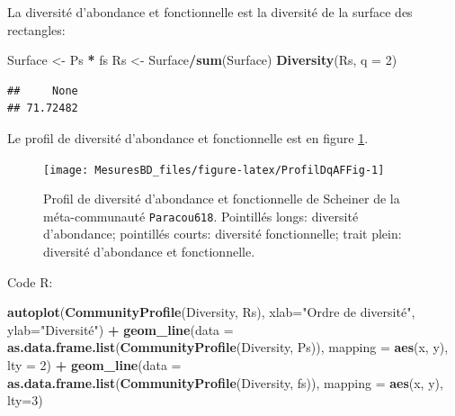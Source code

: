 \documentclass[
  11pt,
  french,
  a4paper,
  extrafontsizes,onecolumn,openright
  ]{memoir}
\newenvironment{Shaded}{\begin{snugshade}}{\end{snugshade}}
\newcommand{\DataTypeTok}[1]{\textcolor[rgb]{0.13,0.29,0.53}{#1}}
\newcommand{\DecValTok}[1]{\textcolor[rgb]{0.00,0.00,0.81}{#1}}
\newcommand{\KeywordTok}[1]{\textcolor[rgb]{0.13,0.29,0.53}{\textbf{#1}}}
\newcommand{\NormalTok}[1]{#1}
\newcommand{\OperatorTok}[1]{\textcolor[rgb]{0.81,0.36,0.00}{\textbf{#1}}}
\newcommand{\StringTok}[1]{\textcolor[rgb]{0.31,0.60,0.02}{#1}}
\newlength{\rf}
\begin{document}
\normalsize

La diversité d'abondance et fonctionnelle est la diversité de la surface des rectangles:

\scriptsize

\begin{Shaded}
\begin{Highlighting}[]
\NormalTok{Surface <-}\StringTok{ }\NormalTok{Ps }\OperatorTok{*}\StringTok{ }\NormalTok{fs}
\NormalTok{Rs <-}\StringTok{ }\NormalTok{Surface}\OperatorTok{/}\KeywordTok{sum}\NormalTok{(Surface)}
\KeywordTok{Diversity}\NormalTok{(Rs, }\DataTypeTok{q =} \DecValTok{2}\NormalTok{)}
\end{Highlighting}
\end{Shaded}

\begin{verbatim}
##     None 
## 71.72482
\end{verbatim}

\normalsize

Le profil de diversité d'abondance et fonctionnelle est en figure \ref{fig:ProfilDqAFFig}.



\scriptsize

\begin{figure}

{\centering \texttt{[image: MesuresBD\_files/figure-latex/ProfilDqAFFig-1]} 

}

\caption{Profil de diversité d'abondance et fonctionnelle de Scheiner de la méta-communauté \texttt{Paracou618}. Pointillés longs: diversité d'abondance; pointillés courts: diversité fonctionnelle; trait plein: diversité d'abondance et fonctionnelle.}\label{fig:ProfilDqAFFig}
\end{figure}

\normalsize

Code R:

\scriptsize

\begin{Shaded}
\begin{Highlighting}[]
\KeywordTok{autoplot}\NormalTok{(}\KeywordTok{CommunityProfile}\NormalTok{(Diversity, Rs), }
         \DataTypeTok{xlab=}\StringTok{"Ordre de diversité"}\NormalTok{, }\DataTypeTok{ylab=}\StringTok{"Diversité"}\NormalTok{) }\OperatorTok{+}
\KeywordTok{geom_line}\NormalTok{(}\DataTypeTok{data =} \KeywordTok{as.data.frame.list}\NormalTok{(}\KeywordTok{CommunityProfile}\NormalTok{(Diversity, Ps)), }
          \DataTypeTok{mapping =} \KeywordTok{aes}\NormalTok{(x, y), }\DataTypeTok{lty =} \DecValTok{2}\NormalTok{) }\OperatorTok{+}
\KeywordTok{geom_line}\NormalTok{(}\DataTypeTok{data =} \KeywordTok{as.data.frame.list}\NormalTok{(}\KeywordTok{CommunityProfile}\NormalTok{(Diversity, fs)),}
          \DataTypeTok{mapping =} \KeywordTok{aes}\NormalTok{(x, y), }\DataTypeTok{lty=}\DecValTok{3}\NormalTok{)}
\end{Highlighting}
\end{Shaded}
\end{document}

